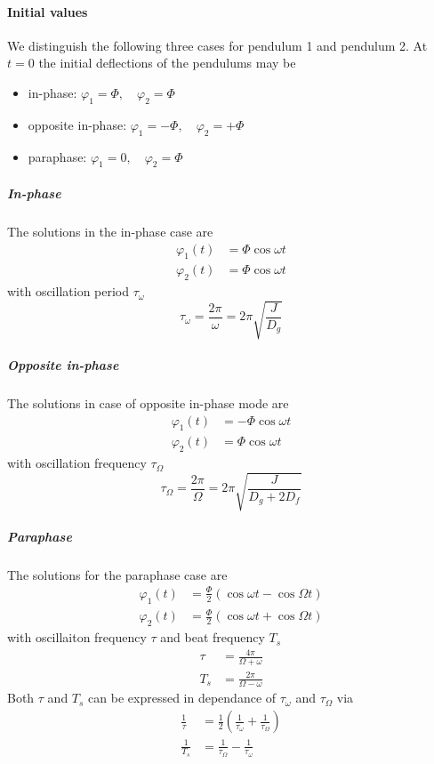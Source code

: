 \documentclass{scrreprt}
\renewcommand{\phi}{\varphi}
\begin{document}
\paragraph{Initial values}
We distinguish the following three cases for pendulum 1 and pendulum 2. At $t=0$ the initial deflections of the pendulums may be
\begin{itemize}
\item in-phase: $\phi_1 = \Phi, \quad \phi_2 = \Phi$
\item opposite in-phase: $\phi_1 = -\Phi, \quad \phi_2 = +\Phi$
\item paraphase: $\phi_1 = 0, \quad \phi_2 = \Phi$
\end{itemize}

\subparagraph*{In-phase}
The solutions in the in-phase case are
\begin{align}
\phi_1(t) &= \Phi \cos{\omega t}\\
\phi_2(t) &= \Phi \cos{\omega t}
\end{align}
with oscillation period $\tau_{\omega}$
\begin{equation}
\tau_{\omega} = \frac{2 \pi}{\omega} = 2 \pi \sqrt{\frac{J}{D_g}}
\end{equation}

\subparagraph*{Opposite in-phase}
The solutions in case of opposite in-phase mode are
\begin{align}
\phi_1(t) &= -\Phi \cos{\omega t}\\
\phi_2(t) &= \Phi \cos{\omega t}
\end{align}
with oscillation frequency $\tau_{\Omega}$
\begin{equation}
\tau_{\Omega} = \frac{2 \pi}{\Omega} = 2 \pi \sqrt{\frac{J}{D_g+2 D_f}}
\end{equation}

\subparagraph*{Paraphase}
The solutions for the paraphase case are
\begin{align}
\phi_1(t) &= \frac{\Phi}{2}\left(\cos{\omega t} - \cos{\Omega t}\right)\\
\phi_2(t) &= \frac{\Phi}{2}\left(\cos{\omega t} + \cos{\Omega t}\right)
\end{align}
with oscillaiton frequency $\tau$ and beat frequency $T_s$
\begin{align}
\tau &= \frac{4 \pi}{\Omega + \omega}\\
T_s &= \frac{2 \pi}{\Omega -\omega}
\end{align}
Both $\tau$ and $T_s$ can be expressed in dependance of $\tau_{\omega}$ and $\tau_{\Omega}$ via
\begin{align}
\frac{1}{\tau} &= \frac{1}{2}\left( \frac{1}{\tau_{\omega}} + \frac{1}{\tau_{\Omega}} \right)\label{tau}\\
\frac{1}{T_s} &= \frac{1}{\tau_{\Omega}} - \frac{1}{\tau_{\omega}}\label{ts}
\end{align}
\end{document}
